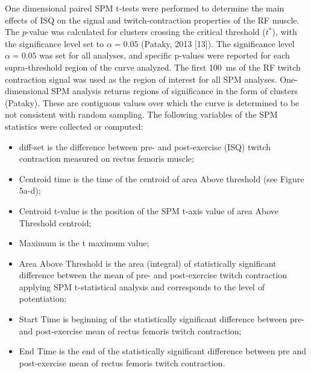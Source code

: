 \documentclass[utf8]{style/FrontiersinHarvard}
\begin{document}
One dimensional paired SPM t-tests were performed to determine the main effects of ISQ on the signal and twitch-contraction properties of the RF muscle.
The $ p $-value was calculated for clusters crossing the critical threshold ($ t^{*} $), with the significance level set to $ \alpha = 0.05 $ (Pataky, 2013 [13]).
The significance level $ \alpha = 0.05 $ was set for all analyses, and specific p-values were reported for each supra-threshold region of the curve analyzed.
The first \SI{100}{\milli \second} of the RF twitch contraction signal was used as the region of interest for all SPM analyses.
One-dimensional SPM analysis returns regions of significance in the form of clusters (Pataky).
These are contiguous values over which the curve is determined to be not consistent with random sampling.
The following variables of the SPM statistics were collected or computed:
\begin{itemize}

    \item diff-set is the difference between pre- and post-exercise (ISQ) twitch contraction measured on rectus femoris muscle;

    \item Centroid time is the time of the centroid of area Above threshold (see Figure 5a-d);

    \item Centroid t-value is the position of the SPM t-axis value of area Above Threshold centroid;

    \item Maximum is the t maximum value;

    \item Area Above Threshold is the area (integral) of statistically significant difference between the mean of pre- and post-exercise twitch contraction applying SPM t-statistical analysis and corresponds to the level of potentiation;

    \item Start Time is beginning of the statistically significant difference between pre- and post-exercise mean of rectus femoris twitch contraction;

    \item End Time is the end of the statistically significant difference between pre and post-exercise mean of rectus femoris twitch contraction.

\end{itemize}
\end{document}
